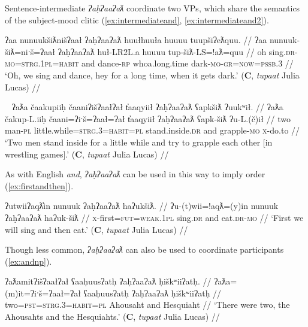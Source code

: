 
Sentence-intermediate \textit{ʔaḥʔaaʔaƛ} coordinate two VPs, which share the semantics of the subject-mood clitic (\ref{ex:intermediateand}, \ref{ex:intermediateand2}).

\ex \label{ex:intermediateand}
\begingl
\glpreamble ʔaa nunuukšiƛnišʔaał ʔaḥʔaaʔaƛ huułhuuła huuuu tuupšiʔeƛquu. //
\gla ʔaa nunuuk-šiƛ=niˑš=ʔaał ʔaḥʔaaʔaƛ huł-LR2L.a huuuu tup-šiƛ-LS=!aƛ=quu //
\glb oh sing.\textsc{dr}-\textsc{mo}=\textsc{strg.1pl}=\textsc{habit} and dance-\textsc{rp} whoa.long.time dark-\textsc{mo}-\textsc{gr}=\textsc{now}=\textsc{pssb.3} //
\glft `Oh, we sing and dance, hey for a long time, when it gets dark.' (\textbf{C}, \textit{tupaat} Julia Lucas) //
\endgl
\xe


\ex~ \label{ex:intermediateand2}
\begingl
\glpreamble ʔaƛa čaakupiiḥ čaaniʔišʔaałʔał t̓aaqyiił ʔaḥʔaaʔaƛ ʕapkšiƛ ʔuukʷił. //
\gla ʔaƛa čakup-L.iiḥ čaani=ʔiˑš=ʔaał=ʔał t̓aaqyiił ʔaḥʔaaʔaƛ ʕapk-šiƛ ʔu-L.(č)ił //
\glb two man-\textsc{pl} little.while=\textsc{strg.3}=\textsc{habit}=\textsc{pl} stand.inside.\textsc{dr} and grapple-\textsc{mo} \textsc{x}-do.to //
\glft `Two men stand inside for a little while and try to grapple each other [in wrestling games].' (\textbf{C}, \textit{tupaat} Julia Lucas) //
\endgl
\xe

As with English \textit{and}, \textit{ʔaḥʔaaʔaƛ} can be used in this way to imply order (\ref{ex:firstandthen}).

\ex \label{ex:firstandthen}
\begingl
\glpreamble ʔutwiiʔaqƛ̓in nunuuk ʔaḥʔaaʔaƛ haʔukšiƛ. //
\gla ʔu-(t)wii=!aqƛ=(y)in nunuuk ʔaḥʔaaʔaƛ haʔuk-šiƛ //
\glb \textsc{x}-first=\textsc{fut}=\textsc{weak.1pl} sing.\textsc{dr} and eat.\textsc{dr}-\textsc{mo} //
\glft `First we will sing and then eat.' (\textbf{C}, \textit{tupaat} Julia Lucas) //
\endgl
\xe

Though less common, \textit{ʔaḥʔaaʔaƛ} can also be used to coordinate participants (\ref{ex:andnp}).

\ex \label{ex:andnp}
\begingl
\glpreamble ʔaƛamitʔišʔaałʔał ʕaaḥuusʔatḥ ʔaḥʔaaʔaƛ ḥiškʷiiʔatḥ. //
\gla ʔaƛa=(m)it=ʔiˑš=ʔaał=ʔał ʕaaḥuusʔatḥ ʔaḥʔaaʔaƛ ḥiškʷiiʔatḥ //
\glb two=\textsc{pst}=\textsc{strg.3}=\textsc{habit}=\textsc{pl} Ahousaht and Hesquiaht //
\glft `There were two, the Ahousahts and the Hesquiahts.' (\textbf{C}, \textit{tupaat} Julia Lucas) //
\endgl
\xe


